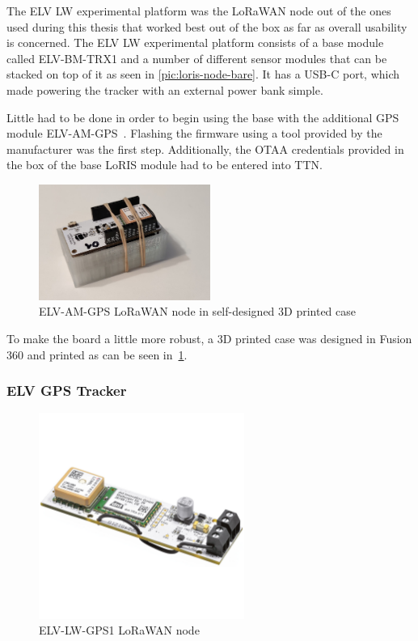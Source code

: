 The ELV LW experimental platform was the \ac{LoRaWAN} node out of the ones used during this thesis that worked best out of the box as far as overall usability is concerned\cite{elv_elektronik_ag_elv-lw-base_2023}.
The ELV LW experimental platform consists of a base module called ELV-BM-TRX1 and a number of different sensor modules that can be stacked on top of it as seen in \cref{pic:loris-node-bare}.
It has a USB-C port, which made powering the tracker with an external power bank simple.

Little had to be done in order to begin using the base with the additional \ac{GPS} module ELV-AM-GPS~\cite{elv_elektronik_ag_elv-track_2022}.
Flashing the firmware using a tool provided by the manufacturer was the first step.
Additionally, the \ac{OTAA} credentials provided in the box of the base LoRIS module had to be entered into \ac{TTN}.

\begin{figure}
    \centering
    \includegraphics[width=0.5\textwidth]{pictures/hardware/gps-nodes/loris_with_case.jpg}
    \caption{ELV-AM-GPS \ac{LoRaWAN} node in self-designed 3D printed case\label{pic:loris-node-with-case}}
\end{figure}

To make the board a little more robust, a 3D printed case was designed in Fusion 360 and printed as can be seen in~\cref{pic:loris-node-with-case}.

\subsubsection{ELV \acs{GPS} Tracker}

\begin{figure}
    \centering
    \includegraphics[width=0.6\textwidth]{pictures/hardware/gps-nodes/ELV-LW-GPS1.jpg}
    \caption{ELV-LW-GPS1 \ac{LoRaWAN} node~\protect\cite{elv_elektronik_ag_elv_2023}}
\end{figure}

